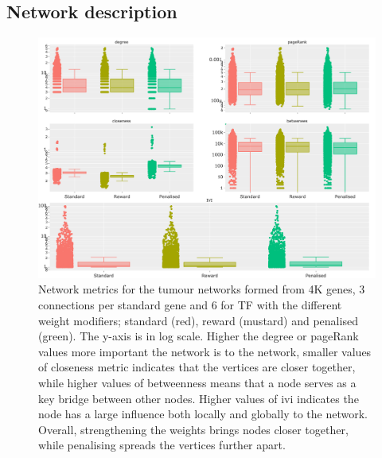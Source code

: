 

\subsection{Network description} \label{s:N_I:tum_describe}

\begin{figure}[!t]  
\centering
\includegraphics[width=1.0\textwidth,keepaspectratio]{Sections/Network_I/Resources/Tum_network/NetworkMetricsComp_6TF.png}
    \caption[Tum: centrality network metrics]{Network metrics for the tumour networks formed from 4K genes, 3 connections per standard gene and 6 for TF with the different weight modifiers; standard (red), reward (mustard) and penalised (green). The y-axis is in log scale. Higher the degree or pageRank values more important the network is to the network, smaller values of closeness metric indicates that the vertices are closer together, while higher values of betweenness means that a node serves as a key bridge between other nodes. Higher values of \acrlong{ivi} indicates the node has a large influence both locally and globally to the network. Overall, strengthening the weights brings nodes closer together, while penalising spreads the vertices further apart.  }
    \label{fig:N_I:net_metrics_tum}
\end{figure}

